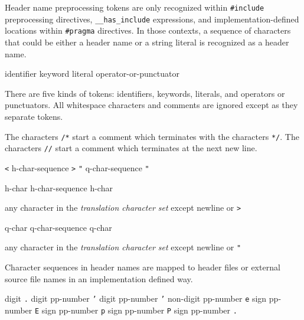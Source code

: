 \p Header name preprocessing tokens are only recognized within
\texttt{\#include} preprocessing directives, \texttt{\_\_has\_include}
expressions, and implementation-defined locations within \texttt{\#pragma}
directives. In those contexts, a sequence of characters that could be either a
header name or a string literal is recognized as a header name.


\begin{grammar}
  \br
  identifier\br
  keyword\br
  literal\br
  operator-or-punctuator
\end{grammar}

\p There are five kinds of tokens: identifiers, keywords, literals, and
operators or punctuators. All whitespace characters and comments are ignored
except as they separate tokens.


\p The characters \texttt{/*} start a comment which terminates with the
characters \texttt{*/}. The characters \texttt{//} start a comment
which terminates at the next new line.


\begin{grammar}
  \br
  \texttt{<} h-char-sequence \texttt{>}\br
  \texttt{"} q-char-sequence \texttt{"}

  \br
  h-char\br
  h-char-sequence h-char

  \br
  \textnormal{any character in the \textit{translation character set} except
  newline or \texttt{>}}

  \br
  q-char\br
  q-char-sequence q-char

  \br
  \textnormal{any character in the \textit{translation character set} except
  newline or \texttt{"}}
\end{grammar}

\p Character sequences in header names are mapped to header files or external
source file names in an implementation defined way.


\begin{grammar}
  \br
  digit\br
  \texttt{.} digit\br
  pp-number \texttt{'} digit\br
  pp-number \texttt{'} non-digit\br
  pp-number \texttt{e} sign\br
  pp-number \texttt{E} sign\br
  pp-number \texttt{p} sign\br
  pp-number \texttt{P} sign\br
  pp-number \texttt{.}
\end{grammar}

